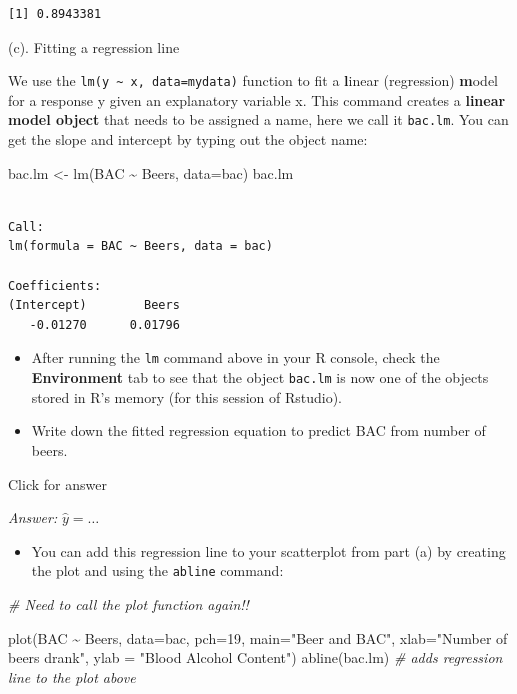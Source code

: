 \documentclass[
]{book}
\newenvironment{Shaded}{\begin{snugshade}}{\end{snugshade}}
\newcommand{\AttributeTok}[1]{\textcolor[rgb]{0.77,0.63,0.00}{#1}}
\newcommand{\CommentTok}[1]{\textcolor[rgb]{0.56,0.35,0.01}{\textit{#1}}}
\newcommand{\DecValTok}[1]{\textcolor[rgb]{0.00,0.00,0.81}{#1}}
\newcommand{\FunctionTok}[1]{\textcolor[rgb]{0.00,0.00,0.00}{#1}}
\newcommand{\NormalTok}[1]{#1}
\newcommand{\OtherTok}[1]{\textcolor[rgb]{0.56,0.35,0.01}{#1}}
\newcommand{\SpecialCharTok}[1]{\textcolor[rgb]{0.00,0.00,0.00}{#1}}
\newcommand{\StringTok}[1]{\textcolor[rgb]{0.31,0.60,0.02}{#1}}
\providecommand{\tightlist}{%
  \setlength{\itemsep}{0pt}\setlength{\parskip}{0pt}}
\begin{document}
\begin{verbatim}
[1] 0.8943381
\end{verbatim}

(c). Fitting a regression line

We use the \texttt{lm(y\ \textasciitilde{}\ x,\ data=mydata)} function to fit a \textbf{l}inear (regression) \textbf{m}odel for a response y given an explanatory variable x. This command creates a \textbf{linear model object} that needs to be assigned a name, here we call it \texttt{bac.lm}. You can get the slope and intercept by typing out the object name:

\begin{Shaded}
\begin{Highlighting}[]
\NormalTok{bac.lm }\OtherTok{\textless{}{-}} \FunctionTok{lm}\NormalTok{(BAC }\SpecialCharTok{\textasciitilde{}}\NormalTok{ Beers, }\AttributeTok{data=}\NormalTok{bac)}
\NormalTok{bac.lm}
\end{Highlighting}
\end{Shaded}

\begin{verbatim}

Call:
lm(formula = BAC ~ Beers, data = bac)

Coefficients:
(Intercept)        Beers  
   -0.01270      0.01796  
\end{verbatim}

\begin{itemize}
\item
  After running the \texttt{lm} command above in your R console, check the \textbf{Environment} tab to see that the object \texttt{bac.lm} is now one of the objects stored in R's memory (for this session of Rstudio).
\item
  Write down the fitted regression equation to predict BAC from number of beers.
\end{itemize}

Click for answer

\emph{Answer:} \(\hat{y} = \ldots\)

\begin{itemize}
\tightlist
\item
  You can add this regression line to your scatterplot from part (a) by creating the plot and using the \texttt{abline} command:
\end{itemize}

\begin{Shaded}
\begin{Highlighting}[]
\CommentTok{\# Need to call the plot function again!!}

\FunctionTok{plot}\NormalTok{(BAC }\SpecialCharTok{\textasciitilde{}}\NormalTok{ Beers, }\AttributeTok{data=}\NormalTok{bac, }\AttributeTok{pch=}\DecValTok{19}\NormalTok{, }
     \AttributeTok{main=}\StringTok{"Beer and BAC"}\NormalTok{, }\AttributeTok{xlab=}\StringTok{"Number of beers drank"}\NormalTok{, }\AttributeTok{ylab =} \StringTok{"Blood Alcohol Content"}\NormalTok{)}
\FunctionTok{abline}\NormalTok{(bac.lm) }\CommentTok{\# adds regression line to the plot above}
\end{Highlighting}
\end{Shaded}
\end{document}
